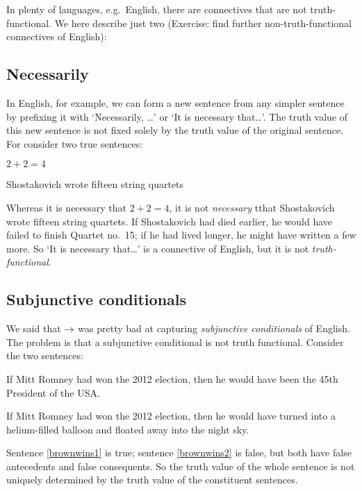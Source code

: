 



In plenty of languages, e.g.~English, there are connectives that are not truth-functional. We here describe just two (Exercise: find further non-truth-functional connectives of English):

\subsection{Necessarily}

In English, for example, we can form a new sentence from any simpler sentence by prefixing it with `Necessarily, \ldots' or  `It is necessary that\ldots'. The truth value of this new sentence is not fixed solely by the truth value of the original sentence. For consider two true sentences:
	\begin{earg}
		\item[\ex{nec-math}] $2 + 2 = 4$
		\item[\ex{nec-music}] Shostakovich wrote fifteen string quartets
	\end{earg}
Whereas it is necessary that $2 + 2 = 4$, it is not \emph{necessary} tthat Shostakovich wrote fifteen string quartets. If Shostakovich had died earlier, he would have failed to finish Quartet no.\ 15; if he had lived longer, he might have written a few more. So `It is necessary that\ldots' is a connective of English, but it is not \emph{truth-functional}.



\subsection{Subjunctive conditionals}\label{s:IndicativeSubjunctive}



We said that $\rightarrow$ was pretty bad at capturing \emph{subjunctive conditionals} of English. The problem is that a subjunctive conditional is not truth functional.
Consider the two sentences:
	\begin{earg}
		\item[\ex{brownwins1}] If Mitt Romney had won the 2012 election, then he would have been the 45th President of the USA.
		\item[\ex{brownwins2}] If Mitt Romney had won the 2012 election, then he would have turned into a helium-filled balloon and floated away into the night sky.
	\end{earg}
Sentence \ref{brownwins1} is true; sentence \ref{brownwins2} is false, but both have false antecedents and false consequents. So the truth value of the whole sentence is not uniquely determined by the truth value of the constituent sentences.

